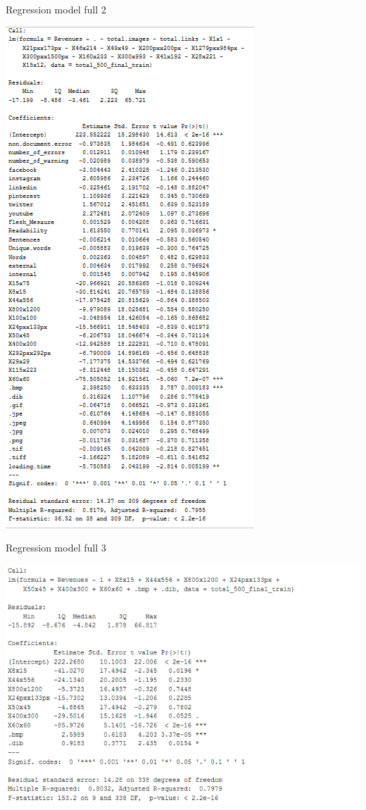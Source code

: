 \documentclass{book}
\begin{document}
\begin{table}[H]
\centering
\caption{Regression model full 2}\label{d :r :2}
\begin{center}
\includegraphics[scale=0.8]{../R/photos/69_full2.PNG}   \\
\end{center}
\end{table}


\begin{table}[H]
\centering
\caption{Regression model full 3}\label{d :r :3}
\begin{center}
\includegraphics[scale=0.6]{../R/photos/72_full3.PNG}   \\
\end{center}
\end{table}
\end{document}
